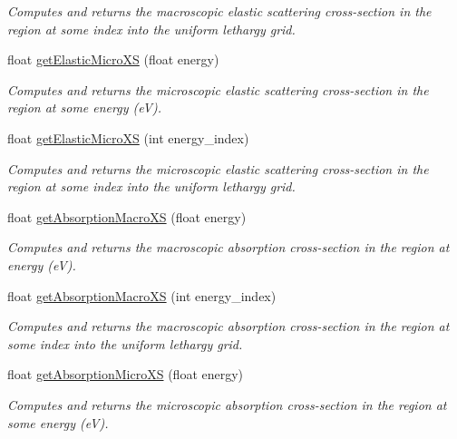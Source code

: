 \begin{DoxyCompactItemize}
\begin{DoxyCompactList}\small\item\em Computes and returns the macroscopic elastic scattering cross-\/section in the region at some index into the uniform lethargy grid. \end{DoxyCompactList}\item 
float \hyperlink{classRegion_a481bb2ea17d504a72a37c46d3a54acbb}{get\-Elastic\-Micro\-X\-S} (float energy)
\begin{DoxyCompactList}\small\item\em Computes and returns the microscopic elastic scattering cross-\/section in the region at some energy (e\-V). \end{DoxyCompactList}\item 
float \hyperlink{classRegion_a933559a825a28f29adfdfe3f592d34bd}{get\-Elastic\-Micro\-X\-S} (int energy\-\_\-index)
\begin{DoxyCompactList}\small\item\em Computes and returns the microscopic elastic scattering cross-\/section in the region at some index into the uniform lethargy grid. \end{DoxyCompactList}\item 
float \hyperlink{classRegion_a5bdd08baa4b621e7ed540438d8624cb7}{get\-Absorption\-Macro\-X\-S} (float energy)
\begin{DoxyCompactList}\small\item\em Computes and returns the macroscopic absorption cross-\/section in the region at energy (e\-V). \end{DoxyCompactList}\item 
float \hyperlink{classRegion_ae7a0fe8576783dfa724e8db9dd2e1365}{get\-Absorption\-Macro\-X\-S} (int energy\-\_\-index)
\begin{DoxyCompactList}\small\item\em Computes and returns the macroscopic absorption cross-\/section in the region at some index into the uniform lethargy grid. \end{DoxyCompactList}\item 
float \hyperlink{classRegion_a96446c70b8fe96ceffc301c7589c152b}{get\-Absorption\-Micro\-X\-S} (float energy)
\begin{DoxyCompactList}\small\item\em Computes and returns the microscopic absorption cross-\/section in the region at some energy (e\-V). \end{DoxyCompactList}\item 

\end{DoxyCompactItemize}

